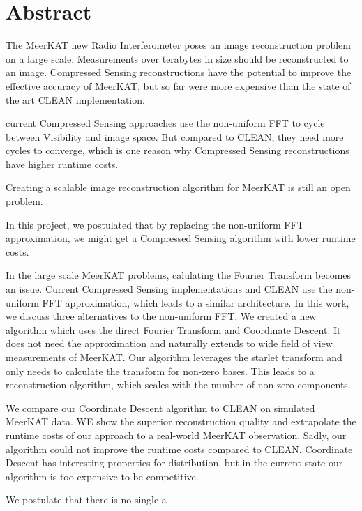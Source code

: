\section*{Abstract}
The MeerKAT new Radio Interferometer poses an image reconstruction problem on a large scale. Measurements over terabytes in size should be reconstructed to an image. Compressed Sensing reconstructions have the potential to improve the effective accuracy of MeerKAT, but so far were more expensive than the state of the art CLEAN implementation.

current Compressed Sensing approaches use the non-uniform FFT to cycle between Visibility and image space. But compared to CLEAN, they need more cycles to converge, which is one reason why Compressed Sensing reconstructions have higher runtime costs.

Creating a scalable image reconstruction algorithm for MeerKAT is still an open problem.

In this project, we postulated that by replacing the non-uniform FFT approximation, we might get a Compressed Sensing algorithm with lower runtime costs.

In the large scale MeerKAT problems, calulating the Fourier Transform becomes an issue. Current Compressed Sensing implementations and CLEAN use the non-uniform FFT approximation, which leads to a similar architecture. In this work, we discuss three alternatives to the non-uniform FFT. We created a new algorithm which uses the direct Fourier Transform and Coordinate Descent. It does not need the approximation and naturally extends to wide field of view measurements of MeerKAT. Our algorithm leverages the starlet transform and only needs to calculate the transform for non-zero bases. This leads to a reconstruction algorithm, which scales with the number of non-zero components.

We compare our Coordinate Descent algorithm to CLEAN on simulated MeerKAT data. WE show the superior reconstruction quality and extrapolate the runtime costs of our approach to a real-world MeerKAT observation. Sadly, our algorithm could not improve the runtime costs compared to CLEAN. Coordinate Descent has interesting properties for distribution, but in the current state our algorithm is too expensive to be competitive.

We postulate that there is no single a